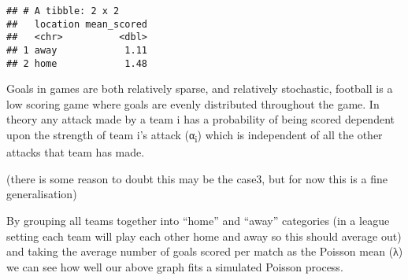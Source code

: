 \documentclass[]{article}
\newenvironment{Shaded}{\begin{snugshade}}{\end{snugshade}}
\newcommand{\KeywordTok}[1]{\textcolor[rgb]{0.13,0.29,0.53}{\textbf{#1}}}
\newcommand{\DataTypeTok}[1]{\textcolor[rgb]{0.13,0.29,0.53}{#1}}
\newcommand{\DecValTok}[1]{\textcolor[rgb]{0.00,0.00,0.81}{#1}}
\newcommand{\FloatTok}[1]{\textcolor[rgb]{0.00,0.00,0.81}{#1}}
\newcommand{\StringTok}[1]{\textcolor[rgb]{0.31,0.60,0.02}{#1}}
\newcommand{\CommentTok}[1]{\textcolor[rgb]{0.56,0.35,0.01}{\textit{#1}}}
\newcommand{\OtherTok}[1]{\textcolor[rgb]{0.56,0.35,0.01}{#1}}
\newcommand{\ControlFlowTok}[1]{\textcolor[rgb]{0.13,0.29,0.53}{\textbf{#1}}}
\newcommand{\OperatorTok}[1]{\textcolor[rgb]{0.81,0.36,0.00}{\textbf{#1}}}
\newcommand{\NormalTok}[1]{#1}
\begin{document}
\begin{verbatim}
## # A tibble: 2 x 2
##   location mean_scored
##   <chr>          <dbl>
## 1 away            1.11
## 2 home            1.48
\end{verbatim}

Goals in games are both relatively sparse, and relatively stochastic,
football is a low scoring game where goals are evenly distributed
throughout the game. In theory any attack made by a team i has a
probability of being scored dependent upon the strength of team i's
attack (α\textsubscript{i}) which is independent of all the other
attacks that team has made.

(there is some reason to doubt this may be the case3, but for now this
is a fine generalisation)

By grouping all teams together into ``home'' and ``away'' categories (in
a league setting each team will play each other home and away so this
should average out) and taking the average number of goals scored per
match as the Poisson mean (λ) we can see how well our above graph fits a
simulated Poisson process.

\begin{Shaded}
\end{Shaded}
\end{document}
